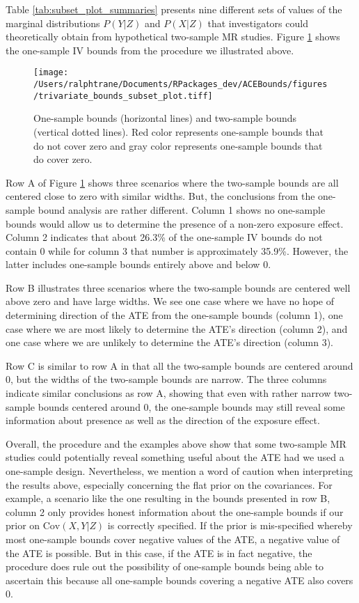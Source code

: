 \documentclass[AMA,STIX1COL,]{WileyNJD-v2}
\begin{document}
Table \ref{tab:subset_plot_summaries} presents nine different sets of
values of the marginal distributions \(P(Y | Z)\) and \(P(X | Z)\) that
investigators could theoretically obtain from hypothetical two-sample MR
studies. Figure \ref{fig:trivariate_bounds} shows the one-sample IV
bounds from the procedure we illustrated above.

\begin{figure}[ht]
  \center
  \texttt{[image: /Users/ralphtrane/Documents/RPackages\_dev/ACEBounds/figures/trivariate\_bounds\_subset\_plot.tiff]}
  \caption{One-sample bounds (horizontal lines) and two-sample bounds (vertical dotted lines). Red color represents one-sample bounds that do not cover zero and gray color represents one-sample bounds that do cover zero.}
  \label{fig:trivariate_bounds}
\end{figure}

Row A of Figure \ref{fig:trivariate_bounds} shows three scenarios where
the two-sample bounds are all centered close to zero with similar
widths. But, the conclusions from the one-sample bound analysis are
rather different. Column 1 shows no one-sample bounds would allow us to
determine the presence of a non-zero exposure effect. Column 2 indicates
that about 26.3\% of the one-sample IV bounds do not contain \(0\) while
for column 3 that number is approximately 35.9\%. However, the latter
includes one-sample bounds entirely above and below 0.

Row B illustrates three scenarios where the two-sample bounds are
centered well above zero and have large widths. We see one case where we
have no hope of determining direction of the ATE from the one-sample
bounds (column 1), one case where we are most likely to determine the
ATE's direction (column 2), and one case where we are unlikely to
determine the ATE's direction (column 3).

Row C is similar to row A in that all the two-sample bounds are centered
around 0, but the widths of the two-sample bounds are narrow. The three
columns indicate similar conclusions as row A, showing that even with
rather narrow two-sample bounds centered around 0, the one-sample bounds
may still reveal some information about presence as well as the
direction of the exposure effect.

Overall, the procedure and the examples above show that some two-sample
MR studies could potentially reveal something useful about the ATE had
we used a one-sample design. Nevertheless, we mention a word of caution
when interpreting the results above, especially concerning the flat
prior on the covariances. For example, a scenario like the one resulting
in the bounds presented in row B, column 2 only provides honest
information about the one-sample bounds if our prior on
\(\text{Cov}(X,Y|Z)\) is correctly specified. If the prior is
mis-specified whereby most one-sample bounds cover negative values of
the ATE, a negative value of the ATE is possible. But in this case, if
the ATE is in fact negative, the procedure does rule out the possibility
of one-sample bounds being able to ascertain this because all one-sample
bounds covering a negative ATE also covers \(0\).
\end{document}
